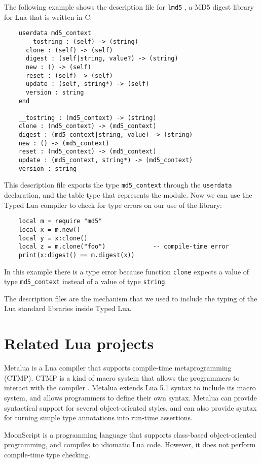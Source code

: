 The following example shows the description file for \texttt{lmd5} \citep{lmd5},
a MD5 digest library for Lua that is written in C:
\begin{verbatim}
    userdata md5_context
      __tostring : (self) -> (string)
      clone : (self) -> (self)
      digest : (self|string, value?) -> (string)
      new : () -> (self)
      reset : (self) -> (self)
      update : (self, string*) -> (self)
      version : string
    end

    __tostring : (md5_context) -> (string)
    clone : (md5_context) -> (md5_context)
    digest : (md5_context|string, value) -> (string)
    new : () -> (md5_context)
    reset : (md5_context) -> (md5_context)
    update : (md5_context, string*) -> (md5_context)
    version : string
\end{verbatim}

This description file exports the type \texttt{md5\string_context}
through the \texttt{userdata} declaration, and the table type
that represents the module.
Now we can use the Typed Lua compiler to check for type errors on
our use of the library:
\begin{verbatim}
    local m = require "md5"
    local x = m.new()
    local y = x:clone()
    local z = m.clone("foo")             -- compile-time error
    print(x:digest() == m.digest(x))
\end{verbatim}

In this example there is a type error because function \texttt{clone}
expects a value of type \texttt{md5\string_context} instead of a value
of type \texttt{string}.

The description files are the mechanism that we used to include the
typing of the Lua standard libraries inside Typed Lua.

\section{Related Lua projects}

Metalua \citep{metalua} is a Lua compiler that supports compile-time
metaprogramming (CTMP).
CTMP is a kind of macro system that allows the programmers to interact
with the compiler \citep{fleutot2007contrasting}. 
Metalua extends Lua 5.1 syntax to include its macro system,
and allows programmers to define their own syntax.
Metalua can provide syntactical support for several object-oriented
styles, and can also provide syntax for turning simple type
annotations into run-time assertions.

MoonScript \citep{moonscript} is a programming language that supports
class-based object-oriented programming, and compiles to idiomatic
Lua code.
However, it does not perform compile-time type checking.

